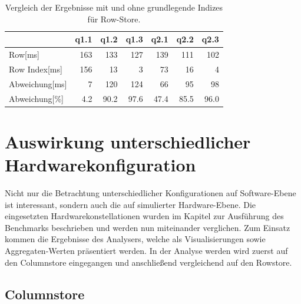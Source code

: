 \begin{table}[H]
    \begin{tabularx}{\linewidth}{lrrrrrr}
        \toprule
                &   q1.1    &   q1.2&	q1.3&	q2.1&	q2.2&	q2.3 \\
                \toprule
Row[ms]	        &	163	    &	133	&	127	&	139	&	111	&	102  \\
Row Index[ms]   &   156     &   13	&   3	&   73	&   16	&   4    \\
Abweichung[ms]  &   7       &   120 &   124 &   66  &   95  &   98   \\
Abweichung[\%]  &   4.2     &   90.2&   97.6&   47.4&   85.5&   96.0 \\    
\bottomrule
    \end{tabularx}
\caption{Vergleich der Ergebnisse mit und ohne grundlegende Indizes für Row-Store.}
\label{tab:basic_index_row}
\end{table}
\section{Auswirkung unterschiedlicher Hardwarekonfiguration}\label{auswertung:hardware}

Nicht nur die Betrachtung unterschiedlicher Konfigurationen auf Software-Ebene ist interessant, sondern auch die auf simulierter Hardware-Ebene. Die eingesetzten Hardwarekonstellationen wurden im Kapitel zur Ausführung des Benchmarks beschrieben und werden nun miteinander verglichen. Zum Einsatz kommen die Ergebnisse des Analysers, welche als Visualisierungen sowie Aggregaten-Werten präsentiert werden. In der Analyse werden wird zuerst auf den Columnstore eingegangen und anschließend vergleichend auf den Rowstore. 

\subsection{Columnstore}

\begin{figure}[H]
\end{figure}


